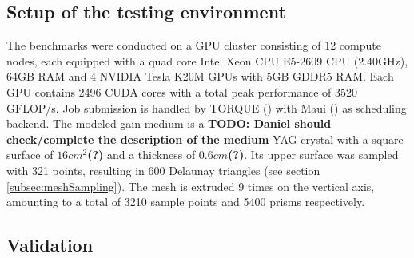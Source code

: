 \subsection{Setup of the testing environment}
\label{subsec:testingEnvironment}


The benchmarks were conducted on a GPU cluster consisting of 12 compute nodes,
each equipped with a quad core Intel Xeon CPU E5-2609 CPU (2.40GHz), 64GB RAM
and 4 NVIDIA Tesla K20M GPUs with 5GB GDDR5 RAM. Each GPU contains 2496 CUDA cores with a total
peak performance of 3520 GFLOP/s. Job submission is handled by TORQUE
(\cite{torque}) with Maui (\cite{maui}) as scheduling backend. The modeled gain medium is a
\textbf{TODO: Daniel should check/complete the description of the medium} YAG
crystal with a square surface of $16cm^2$\textbf{(?)} and a thickness of
$0.6cm$\textbf{(?)}. Its upper surface was sampled with 321 points, resulting in
600 Delaunay triangles (see section \ref{subsec:meshSampling}). The mesh is
extruded 9 times on the vertical axis, amounting to a total of 3210 sample
points and 5400 prisms respectively.

\subsection{Validation}
\label{subsec:validation}

